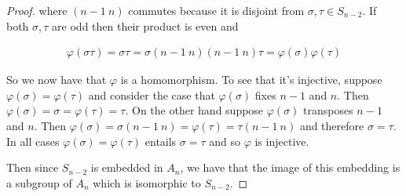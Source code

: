 \documentclass{exam}
\begin{document}
\begin{questions}
\begin{proof}
  where $(n-1\ n)$ commutes because it is disjoint from $\sigma,\tau\in S_{n-2}$.  If both $\sigma,\tau$ are odd then their product is even and

  \begin{align*}
    \varphi(\sigma\tau) = \sigma\tau = \sigma(n-1\ n)(n-1\ n)\tau = \varphi(\sigma)\varphi(\tau)
  \end{align*}

  So we now have that $\varphi$ is a homomorphism.  To see that it's injective, suppose $\varphi(\sigma)=\varphi(\tau)$ and consider the case that $\varphi(\sigma)$ fixes $n-1$ and $n$.  Then $\varphi(\sigma) = \sigma = \varphi(\tau)=\tau$.  On the other hand suppose $\varphi(\sigma)$ transposes $n-1$ and $n$.  Then $\varphi(\sigma) = \sigma(n-1\ n) = \varphi(\tau) = \tau(n-1\ n)$ and therefore $\sigma=\tau$.  In all cases $\varphi(\sigma)=\varphi(\tau)$ entails $\sigma=\tau$ and so $\varphi$ is injective.

  Then since $S_{n-2}$ is embedded in $A_n$, we have that the image of this embedding is a subgroup of $A_n$ which is isomorphic to $S_{n-2}$.
\end{proof}


\end{questions}
\end{document}
